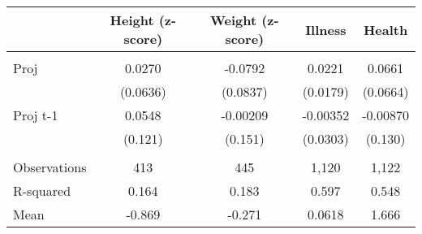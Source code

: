 \begin{tabular}{lcccc} 
  & Height (z-score)  & Weight (z-score)  & Illness & Health \\ \hline
  &  &  &  &  \\
Proj  & 0.0270  & -0.0792 & 0.0221 & 0.0661 \\
  & (0.0636)  & (0.0837) & (0.0179) & (0.0664) \\
Proj t-1  & 0.0548  & -0.00209 & -0.00352 & -0.00870 \\
  & (0.121)  & (0.151) & (0.0303) & (0.130) \\
   &  &  &  &  \\
Observations  & 413 & 445 & 1,120 & 1,122 \\
R-squared  & 0.164 & 0.183 & 0.597 & 0.548 \\
 Mean  & -0.869 & -0.271 & 0.0618 & 1.666 \\ \hline
\end{tabular}
